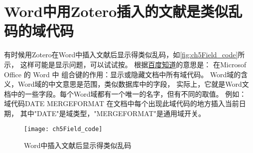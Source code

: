 \documentclass[cn,11pt,chinese]{elegantbook}
\begin{document}
		
		\section{Word中用Zotero插入的文献是类似乱码的域代码}\label{sec:field_code}
		有时候用Zotero在Word中插入文献后显示得类似乱码，如\autoref{fig:ch5Field_code}所示，	
		这样可能是显示问题，可以试试按。
		根据\href{https://link.zhihu.com/?target=https\%3A//zhidao.baidu.com/question/158669989.html}
		{百度知道}的意思是：
    	在Microsof Office 的 Word 中
    	组合键的作用：显示或隐藏文档中所有域代码。
		Word域的含义，Word域的中文意思是范围，类似数据库中的字段，
		实际上，它就是Word文档中的一些字段。每个Word域都有一个唯一的名字，但有不同的取值。
    	例如：
		域代码{DATE\* MERGEFORMAT }在文档中每个出现此域代码的地方插入当前日期，
		其中"DATE"是域类型，"\*MERGEFORMAT"是通用域开关。
			\begin{figure}[htbp]
				\centering
				\texttt{[image: ch5Field\_code]}
				\caption{Word中插入文献后显示得类似乱码}
				\label{fig:ch5Field_code}
			\end{figure}
\end{document}
